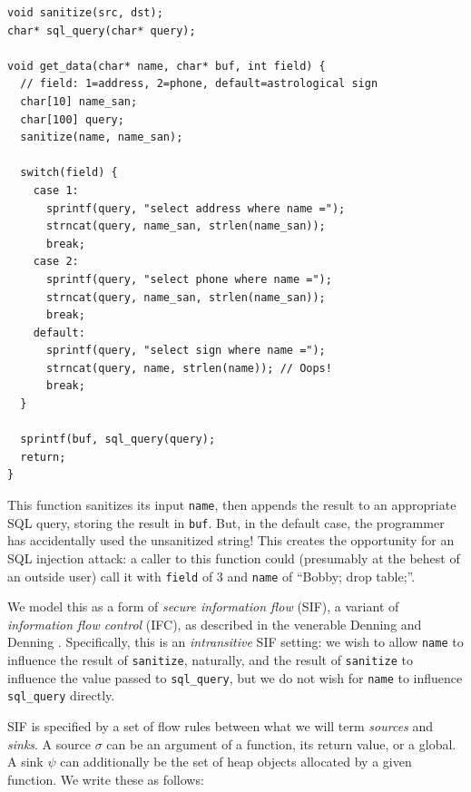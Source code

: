 \documentclass[acmsmall,review,anonymous]{acmart}\settopmatter{printfolios=true,printccs=false,printacmref=false}
\begin{document}
\begin{verbatim}
void sanitize(src, dst);
char* sql_query(char* query);

void get_data(char* name, char* buf, int field) {
  // field: 1=address, 2=phone, default=astrological sign
  char[10] name_san;
  char[100] query;
  sanitize(name, name_san);

  switch(field) {
    case 1:
      sprintf(query, "select address where name =");
      strncat(query, name_san, strlen(name_san));
      break;
    case 2:
      sprintf(query, "select phone where name =");
      strncat(query, name_san, strlen(name_san));
      break;
    default:
      sprintf(query, "select sign where name =");
      strncat(query, name, strlen(name)); // Oops!
      break;
  }

  sprintf(buf, sql_query(query);
  return;
}
\end{verbatim}

This function sanitizes its input {\tt name}, then appends the result to an appropriate SQL
query, storing the result in {\tt buf}. But, in the default case, the programmer has accidentally
used the unsanitized string! This creates the opportunity for an SQL injection attack: a caller
to this function could (presumably at the behest of an outside user) call it with {\tt field} of
3 and {\tt name} of ``Bobby; drop table;''.

We model this as a form of {\em secure information flow} (SIF), a variant of
{\em information flow control} (IFC), as described in the venerable Denning and Denning
\cite{denning1977:SecureInformationFlow}.
Specifically, this is an {\it intransitive} SIF setting: we wish to allow {\tt name} to influence
the result of {\tt sanitize}, naturally, and the result of {\tt sanitize} to influence the
value passed to {\tt sql\_query}, but we do not wish for {\tt name} to influence {\tt sql\_query}
directly.

SIF is specified by a set of flow rules between what we will term {\em sources} and {\em sinks}.
A source \(\sigma\) can be an argument of a function, its return value, or a global.
A sink \(\psi\) can additionally be the set of heap objects allocated by a given function.
We write these as follows:
\end{document}
